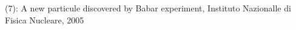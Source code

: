 \documentclass[preview]{standalone}
\begin{document}
\begin{center}
(7): A new particule discovered by Babar experiment, Instituto Nazionalle di Fisica Nucleare, 2005
\end{center}
\end{document}
